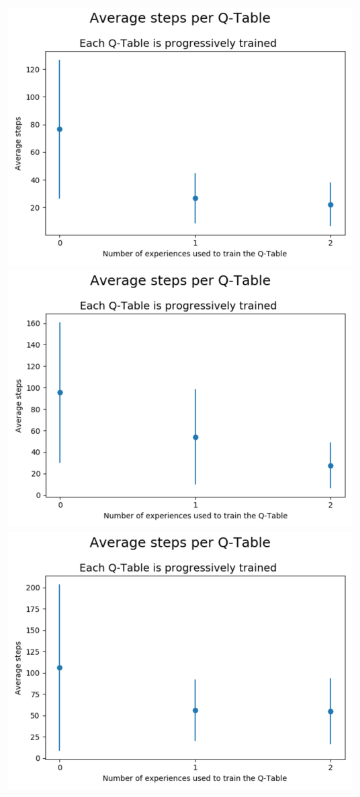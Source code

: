 \documentclass[journal]{IEEEtran}
\begin{document}
\begin{figure}[h!]
\begin{subfigure}{0.5\textwidth}
\includegraphics[scale=0.2]{Images/Average_steps/alex.png}
\includegraphics[scale=0.2]{Images/Average_steps/gonza.png}
\includegraphics[scale=0.2]{Images/Average_steps/jose.png}

\end{subfigure}
\end{figure}
\end{document}
